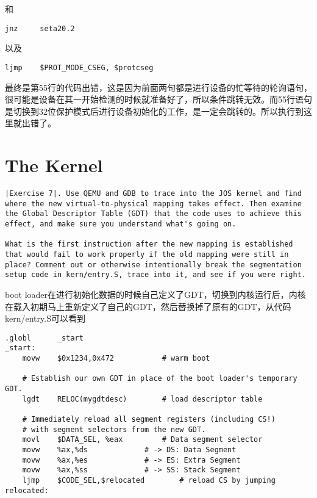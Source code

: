 \documentclass{article}
\begin{document}
\begin{CJK*}{UTF8}{gkai}
和

\begin{lstlisting}[style=acode, firstnumber=39]
  jnz     seta20.2
\end{lstlisting}

以及

\begin{lstlisting}[style=acode, firstnumber=55]
  ljmp    $PROT_MODE_CSEG, $protcseg
\end{lstlisting}

最终是第55行的代码出错，这是因为前面两句都是进行设备的忙等待的轮询语句，很可能是设备在其一开始检测的时候就准备好了，所以条件跳转无效。而55行语句是切换到32位保护模式后进行设备初始化的工作，是一定会跳转的。所以执行到这里就出错了。


\section{The Kernel}

\begin{lstlisting}[style=exercise]
|Exercise 7|. Use QEMU and GDB to trace into the JOS kernel and find where the new virtual-to-physical mapping takes effect. Then examine the Global Descriptor Table (GDT) that the code uses to achieve this effect, and make sure you understand what's going on.

What is the first instruction after the new mapping is established that would fail to work properly if the old mapping were still in place? Comment out or otherwise intentionally break the segmentation setup code in kern/entry.S, trace into it, and see if you were right.
\end{lstlisting}

boot loader在进行初始化数据的时候自己定义了GDT，切换到内核运行后，内核在载入初期马上重新定义了自己的GDT，然后替换掉了原有的GDT，从代码kern/entry.S可以看到

\begin{lstlisting}[style=acode, firstnumber=42, title={\scriptsize \ttfamily \bfseries kern/entry.S}]
.globl      _start
_start:
    movw    $0x1234,0x472           # warm boot

    # Establish our own GDT in place of the boot loader's temporary GDT.
    lgdt    RELOC(mygdtdesc)        # load descriptor table

    # Immediately reload all segment registers (including CS!)
    # with segment selectors from the new GDT.
    movl    $DATA_SEL, %eax         # Data segment selector
    movw    %ax,%ds             # -> DS: Data Segment
    movw    %ax,%es             # -> ES: Extra Segment
    movw    %ax,%ss             # -> SS: Stack Segment
    ljmp    $CODE_SEL,$relocated        # reload CS by jumping
relocated:


\end{lstlisting}
\end{CJK*}
\end{document}
